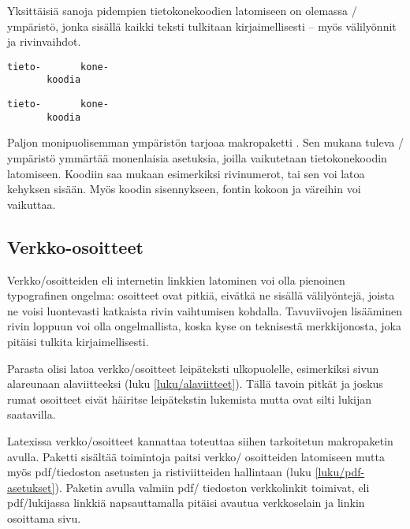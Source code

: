 Yksittäisiä sanoja pidempien tietokonekoodien latomiseen on olemassa
\-/ ympäristö, jonka sisällä kaikki teksti
tulkitaan kirjaimellisesti -- myös välilyönnit ja rivinvaihdot.

\begin{koodilohkosis}
\begin{verbatim}
tieto-       kone-
       koodia
\end{verbatim}
\end{koodilohkosis}

\begin{tulossis}
\begin{verbatim}
tieto-       kone-
       koodia
\end{verbatim}
\end{tulossis}

Paljon monipuolisemman ympäristön tarjoaa makropaketti
. Sen mukana tuleva
\-/ ympäristö ymmärtää monenlaisia asetuksia,
joilla vaikutetaan tietokonekoodin latomiseen. Koodiin saa mukaan
esimerkiksi rivinumerot, tai sen voi latoa kehyksen sisään. Myös koodin
sisennykseen, fontin kokoon ja väreihin voi vaikuttaa.

\subsection{Verkko-osoitteet}

Verkko\-/osoitteiden eli internetin linkkien latominen voi olla
pienoinen typografinen ongelma: osoitteet ovat pitkiä, eivätkä ne
sisällä välilyöntejä, joista ne voisi luontevasti katkaista rivin
vaihtumisen kohdalla. Tavuviivojen lisääminen rivin loppuun voi olla
ongelmallista, koska kyse on teknisestä merkkijonosta, joka pitäisi
tulkita kirjaimellisesti.

Parasta olisi latoa verkko\-/osoitteet leipäteksti ulkopuolelle,
esimerkiksi sivun alareunaan alaviitteeksi (luku
\ref{luku/alaviitteet}). Tällä tavoin pitkät ja joskus rumat osoitteet
eivät häiritse leipätekstin lukemista mutta ovat silti lukijan
saatavilla.

Latexissa verkko\-/osoitteet kannattaa toteuttaa siihen tarkoitetun
makropaketin avulla. Paketti 
sisältää toimintoja paitsi verkko\-/ osoitteiden latomiseen mutta myös
pdf\-/tiedoston asetusten ja ristiviitteiden hallintaan (luku
\ref{luku/pdf-asetukset}). Paketin avulla valmiin pdf\-/ tiedoston
verkkolinkit toimivat, eli pdf\-/lukijassa linkkiä napsauttamalla
pitäisi avautua verkkoselain ja linkin osoittama sivu.

